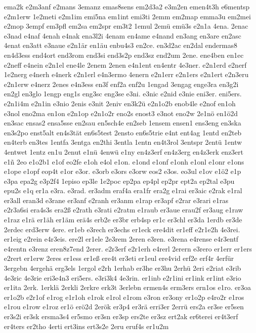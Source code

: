 {ema2k
e2m3anf
e2mans
3emanz
emas8sens
em2d3a2
e3m2en
emen4t3h
e6mentsp
e2m1erw
1e2meti
e2m1im
emi5na
em1int
emi3ti
2emm
em2map
emma3u
em2mei
e2mop
3empf
em3pfl
em2sa
em2spr
em3t2
1emul
2emü
emü3s
e2n1a
4ena.
2enac
e3nad
e4naf
4enah
e4nak
ena3l2i
4enam
en4ame
e4nand
en3ang
en3are
en2asc
4enat
en3att
e3naue
e2n1är
en1äu
enbu4s3
en2ce.
en3d2ac
en2dal
endermas8
en4d3ess
end4ort
end3rom
end3si
end3s2p
end3sz
end2um
2ene.
ene4ben
en1ec
e2neff
e4nein
e2n1el
ene4le
2enem
2enen
e4n1ent
en4entr
4e3ner.
e2n1erd
e2nerf
1e2nerg
e4nerh
e4nerk
e2n1erl
e4n3ermo
4enern
e2n1err
e2n1ers
e2n1ert
e2n3eru
e2n1erw
e4nerz
2enes
e4n3ess
en3f
enf2a
enf2u
1engad
3engag
enge3ra
en3g2i
en2gl
en3glo
1engp
eng1s
eng3sc
eng3se
e3ni.
e3nic
e2nid
e3nie
eni3er.
eni5ers.
e2n1i4m
e2n1in
e3nio
2enis
e3nit
2eniv
en3k2ü
e2n1o2b
enob4le
e2nof
en1oh
e3nol
eno2ma
en1on
e2n1op
e2n1o2r
eno2s
enost3
e3not
eno2w
2e1nö
en1ö2d
en3sac
ensas2
ensa5sse
en2sau
en5sch4e
en2seb
1ensem
ensen1
ens3eng
en3ska
en3s2po
enst5alt
en4s3tät
en6s5test
2ensto
en6s5trie
e4nt
ent4ag
1entd
en2teb
en4terb
en3tes
1entfa
3entga
en2thi
3entla
1entn
en4t3rol
3entspr
2entü
1entw
4entwet
1entz
en1u
2enut
e1nü
4enwü
e1ny
en4z3erf
en4z3erg
en4z3erk
enz3ert
e1ñ
2eo
e1o2b1
e1of
eo2fe
e1oh
e4ol
e1on.
e1ond
e1onf
e1onh
e1onl
e1onr
e1ons
e1ope
e1opf
eop4t
e1or
e3or.
e3orb
e3ors
e3orw
eos2
e3os.
eo3ul
e1ov
e1ö2
e1p
e3pa
epa2g
e3p2f4
1episo
ep3le
1e2poc
ep2pa
ep4pl
ep2pr
ept2a
ep2tal
e3pu
epu2s
e1q
er1a
e3ra.
e3rad.
er3adm
eraf4a
era1fr
era2g
e1rai
er3aic
e2rak
e1ral
er3all
eran3d
e3rane
er3anf
e2ranh
er3anm
e1rap
er3apf
e2rar
e3rari
e1ras
e2r3a6si
era4s3s
era2ß
e2rath
e3rati
e2ratm
e1raub
er3aue
erau2f
er3aug
e1raw
e1raz
e1rä
er1äh
er1äm
erä4s
erb2e
er3br
erb4sp
er1c
er3chl
er3da
1erdb
er3de
2erdec
erd3erw
4ere.
er1eb
e3rech
er3echs
er1eck
ere4dit
er1eff
e2r1e2h
4e3rei.
er1eig
e2rein
e4r3eis.
ere2l
er1ele
2e3rem
2eren
e3ren.
e3rena
e4rense
e4r3entf
e4rentn
e3renz
eren8z7end
2erer.
e2r3erf
e2r1erh
e4rerl
2erern
e3rero
er1err
er1ers
e2rert
er1erw
2eres
er1ess
er1eß
ere4t
er3eti
er1eul
ere4vid
erf2e
erf4r
4erfür
3ergebn
4ergehä
erg3els
1ergol
e2rh
1erhab
er3he
er3hu
2erhü
2eri
e2riat
e3rib
4e3ric
4e3rie
eri3e4n3
eri5ers.
e3ri3k4
4e3rin.
er1inb
e2r1ini
er1ink
er1int
e3rio
er1ita
2erk.
1erklä
2erkli
2erkre
erk3t
3erlebn
ermen4s
erm3ers
ern1os
e1ro.
er3oa
er1o2b
e2r1of
e1rog
e1r1oh
e1rok
e1rol
e1rom
e3ron
er3ony
er1o2p
e4ro2r
e1ros
e1rou
e1row
e1roz
er1ö
erö2d
2erök
er3p4
er3rä
erri3er
2errü
ers2a
er3se
er5sen
er3s2i
er3sk
ersma3s4
er5smo
er3sn
er3sp
ers2te
er3sz
ert2ak
er6terei
er4t3erf
er4ters
er2tho
4erti
ert3ins
ert3s2e
2eru
eruf4s
er1u2m
}
